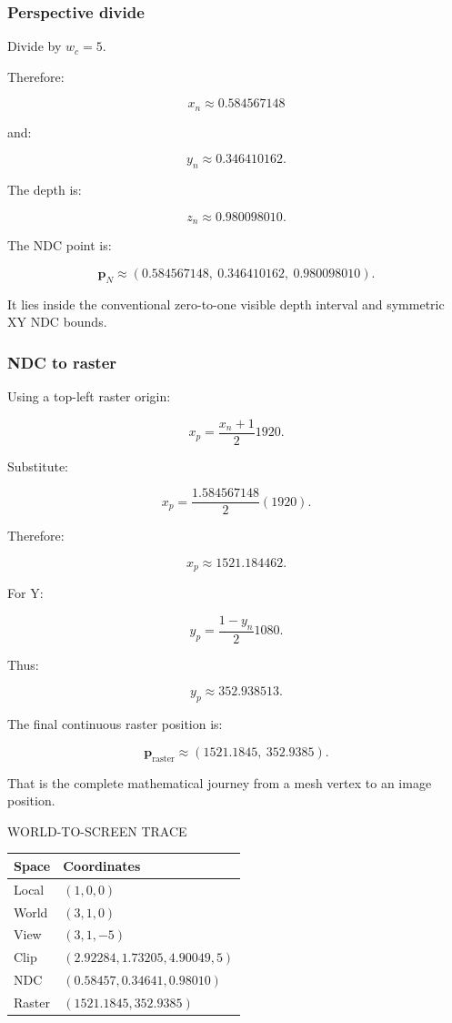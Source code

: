 \subsubsection{Perspective divide}\label{02-foundations-ii-ch037-perspective-divide}

\hypertarget{02-foundations-ii-ch037-perspective-divide}{}

Divide by \(w_c=5\).

Therefore:

\[
 \boxed{ x_n\approx0.584567148 }
\]

and:

\[
 \boxed{ y_n\approx0.346410162 }.
\]

The depth is:

\[
 \boxed{ z_n\approx0.980098010 }.
\]

The NDC point is:

\[
 \boxed{ \mathbf p_N\approx (0.584567148,\ 0.346410162,\ 0.980098010) }.
\]

It lies inside the conventional zero-to-one visible depth interval and symmetric XY NDC bounds.

\subsubsection{NDC to raster}\label{02-foundations-ii-ch037-ndc-to-raster}

\hypertarget{02-foundations-ii-ch037-ndc-to-raster}{}

Using a top-left raster origin:

\[
 x_p=\frac{x_n+1}{2}1920.
\]

Substitute:

\[
 x_p= \frac{1.584567148}{2}(1920).
\]

Therefore:

\[
 \boxed{x_p\approx1521.184462}.
\]

For Y:

\[
 y_p=\frac{1-y_n}{2}1080.
\]

Thus:

\[
 \boxed{y_p\approx352.938513}.
\]

The final continuous raster position is:

\[
 \boxed{ \mathbf p_{\mathrm{raster}} \approx (1521.1845,\ 352.9385) }.
\]

That is the complete mathematical journey from a mesh vertex to an image position.

WORLD-TO-SCREEN TRACE

{\def\LTcaptype{none} %
\begin{longtable}[]{@{}ll@{}}
\toprule\noalign{}
Space & Coordinates \\
\midrule\noalign{}
\endhead
\bottomrule\noalign{}
\endlastfoot
Local & \((1,0,0)\) \\
World & \((3,1,0)\) \\
View & \((3,1,-5)\) \\
Clip & \((2.92284,1.73205,4.90049,5)\) \\
NDC & \((0.58457,0.34641,0.98010)\) \\
Raster & \((1521.1845,352.9385)\) \\
\end{longtable}
}

